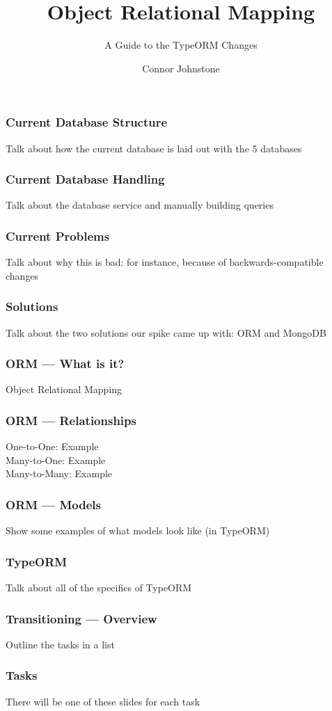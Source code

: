 \documentclass{beamer}
\title[]{Object Relational Mapping}
\subtitle[]{A Guide to the TypeORM Changes}
\author[]{Connor Johnstone}
\institute[]{Palski and Associates}
\date{}
\begin{document}
  \begin{frame}
  \titlepage
  \end{frame}

  \begin{frame}[fragile]
  \frametitle{Current Database Structure}
  Talk about how the current database is laid out with the 5 databases
  \end{frame}

  \begin{frame}[fragile]
  \frametitle{Current Database Handling}
  Talk about the database service and manually building queries
  \end{frame}

  \begin{frame}[fragile]
  \frametitle{Current Problems}
  Talk about why this is bad: for instance, because of backwards-compatible changes
  \end{frame}

  \begin{frame}[fragile]
  \frametitle{Solutions}
  Talk about the two solutions our spike came up with: ORM and MongoDB
  \end{frame}

  \begin{frame}[fragile]
  \frametitle{ORM --- What is it?}
  Object Relational Mapping
  \end{frame}

  \begin{frame}[fragile]
  \frametitle{ORM --- Relationships}
  One-to-One: Example \\
  Many-to-One: Example \\
  Many-to-Many: Example
  \end{frame}

  \begin{frame}[fragile]
  \frametitle{ORM --- Models}
    Show some examples of what models look like (in TypeORM)
  \end{frame}

  \begin{frame}[fragile]
  \frametitle{TypeORM}
  Talk about all of the specifics of TypeORM
  \end{frame}

  \begin{frame}[fragile]
  \frametitle{Transitioning --- Overview}
  Outline the tasks in a list
  \end{frame}

  \begin{frame}[fragile]
  \frametitle{Tasks}
  There will be one of these slides for each task
  \end{frame}
\end{document}
